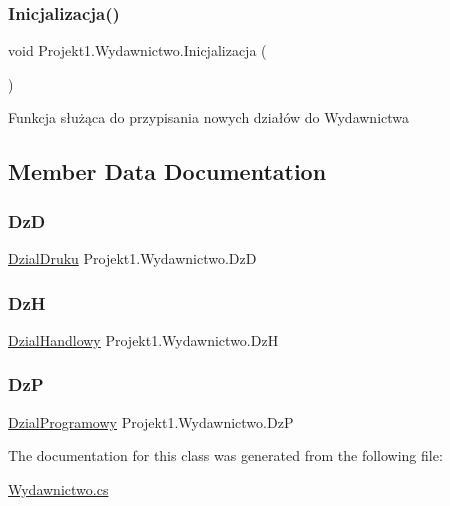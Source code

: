 \subsubsection{\texorpdfstring{Inicjalizacja()}{Inicjalizacja()}}
{\footnotesize\ttfamily void Projekt1.\+Wydawnictwo.\+Inicjalizacja (\begin{DoxyParamCaption}{ }\end{DoxyParamCaption})}



Funkcja służąca do przypisania nowych działów do Wydawnictwa 



\subsection{Member Data Documentation}
\mbox{\label{class_projekt1_1_1_wydawnictwo_aa39e9dd77e7dcb3909f325a25a081e2b}} 
\subsubsection{\texorpdfstring{DzD}{DzD}}
{\footnotesize\ttfamily \mbox{\hyperlink{class_projekt1_1_1_dzial_druku}{Dzial\+Druku}} Projekt1.\+Wydawnictwo.\+DzD}

\mbox{\label{class_projekt1_1_1_wydawnictwo_a545a5aa060825866a59e9bbd3183b119}} 
\subsubsection{\texorpdfstring{DzH}{DzH}}
{\footnotesize\ttfamily \mbox{\hyperlink{class_projekt1_1_1_dzial_handlowy}{Dzial\+Handlowy}} Projekt1.\+Wydawnictwo.\+DzH}

\mbox{\label{class_projekt1_1_1_wydawnictwo_aa278517d1ce41396caf9a5f49efc39df}} 
\subsubsection{\texorpdfstring{DzP}{DzP}}
{\footnotesize\ttfamily \mbox{\hyperlink{class_projekt1_1_1_dzial_programowy}{Dzial\+Programowy}} Projekt1.\+Wydawnictwo.\+DzP}



The documentation for this class was generated from the following file\+:\begin{DoxyCompactItemize}
\item 
\mbox{\hyperlink{_wydawnictwo_8cs}{Wydawnictwo.\+cs}}\end{DoxyCompactItemize}
